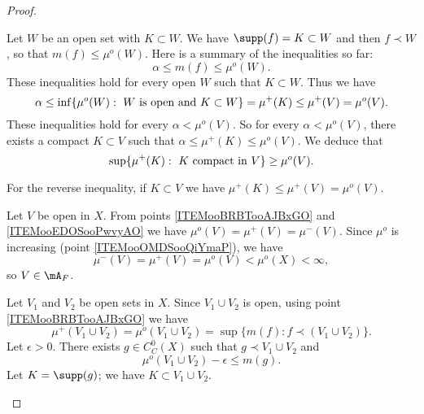 \begin{proof}
\begin{subproof}
        Let \( W\) be an open set with \( K\subset W\). We have \( \supp(f)=K\subset W\) and then \( f\prec W\), so that $m(f)\leq \mu^o(W)$. Here is a summary of the inequalities so far:
        \begin{equation}
            \alpha\leq m(f)\leq \mu^o(W).
        \end{equation}
        These inequalities hold for every open \( W\) such that \( K\subset W\). Thus we have
        \begin{equation}
                \alpha\leq \inf\{ \mu^o(W):\text{ \( W\) is open and \( K\subset W\)} \} =\mu^+(K) \leq \mu^+(V)= \mu^o(V).
        \end{equation}
        These inequalities hold for every \( \alpha<\mu^o(V)\). So for every \( \alpha<\mu^o(V)\), there exists a compact \( K\subset V\) such that \( \alpha\leq \mu^+(K)\leq \mu^o(V)\). We deduce that
        \begin{equation}
            \sup\{ \mu^+(K):\text{ \( K\) compact in \( V\)} \}\geq \mu^o(V).
        \end{equation}
        
        For the reverse inequality, if \( K\subset V\) we have \( \mu^+(K)\leq \mu^+(V)=\mu^o(V)\).

        Let \( V\) be open in \( X\). From points \ref{ITEMooBRBTooAJBxGO} and \ref{ITEMooEDOSooPwvyAO} we have \( \mu^o(V)=\mu^+(V)=\mu^-(V)\). Since \( \mu^o\) is increasing (point \ref{ITEMooOMDSooQiYmaP}), we have
        \begin{equation}
            \mu^-(V)=\mu^+(V)=\mu^o(V)<\mu^o(X)<\infty,
        \end{equation}
        so \( V\in\mA_F\).

            \label{ITEMooLPYWooONCYTi}
        Let \( V_1\) and \( V_2\) be open sets in \( X\). Since \( V_1\cup V_2\) is open, using point \ref{ITEMooBRBTooAJBxGO} we have
        \begin{equation}
            \mu^+(V_1\cup V_2)=\mu^o(V_1\cup V_2)=\sup\{ m(f):f\prec (V_1\cup V_2) \}. 
        \end{equation}
        Let \( \epsilon>0\). There exists \( g\in C^0_C(X)\) such that \( g\prec V_1\cup V_2\) and 
        \begin{equation}        \label{LEMooFYAAooDaOYUy}
            \mu^o(V_1\cup V_2)-\epsilon\leq m(g).
        \end{equation}
        Let \( K=\supp(g)\); we have \( K\subset V_1\cup V_2\).


\end{subproof}
\end{proof}
